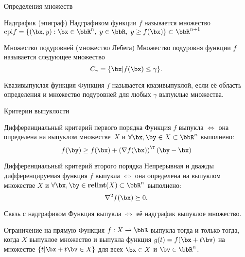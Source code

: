 \documentclass[12pt]{beamer}
\begin{document}
\begin{frame}{Определения множеств}
\begin{block}{Надграфик (эпиграф)}
Надграфиком функции $f$ называется множество $\text{epi}f = \{ (\bx, y) : \bx \in \bbR^n, \; y \in \bbR, \; y \geq f(\bx) \} \subset \bbR^{n+1}$
\end{block}

\begin{block}{Множество подуровней (множество Лебега)}
Множество подуровня функции $f$ называется следующее множество
\vspace{-4mm}
\[
C_{\gamma} = \{ \bx | f(\bx) \leq \gamma \}.
\]
\end{block}

\begin{block}{Квазивыпуклая функция}
Функция $f$ называется квазивыпуклой, если её область определения и множество подуровней для любых $\gamma$ выпуклые множества. 
\end{block}
\end{frame}

\begin{frame}{Критерии выпуклости}
\footnotesize
\vspace{-2mm}
\begin{block}{Дифференциальный критерий первого порядка}
Функция $f$ выпукла $\Leftrightarrow$ она определена на выпуклом множестве~$X$ и $\forall \bx, \by \in X \subset \bbR^n$ выполнено:
\vspace{-4mm}
\[
f(\by) \geq f(\bx) + \left( \nabla f(\bx) \right)^{\T} (\by - \bx)
\]
\end{block}

\begin{block}{Дифференциальный критерий второго порядка}
Непрерывная и дважды дифференцируемая функция $f$ выпукла $\Leftrightarrow$ она определена на выпуклом множестве $X$ и $\forall \bx, \by \in \textbf{relint}(X) \subset \bbR^n$ выполнено:
\vspace{-2mm}
\[
\nabla^2 f(\bx) \succeq 0.
\]
\end{block}

\begin{block}{Связь с надграфиком}
Функция выпукла $\Leftrightarrow$ её надграфик выпуклое множество.
\end{block}

\begin{block}{Ограничение на прямую}
Функция $f: X \rightarrow \bbR$ выпукла тогда и только тогда, когда $X$ выпуклое множество и выпукла функция $g(t) = f(\bx + t\bv)$ на множестве $\{ t | \bx + t\bv \in X \}$ для всех $\bx \in X$ и $\bv \in \bbR^n$.
\end{block}

\end{frame}
\end{document}
